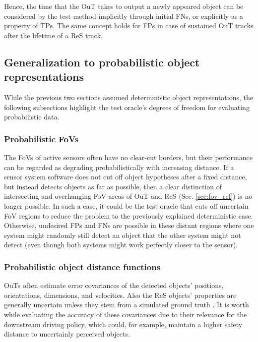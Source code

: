 \documentclass[conference]{IEEEtran}
\begin{document}
Hence, the time that the OuT takes to output a newly appeared object can be considered by the test method implicitly through initial FNs, or explicitly as a property of TPs.
The same concept holds for FPs in case of sustained OuT tracks after the lifetime of a ReS track.



\subsection{Generalization to probabilistic object representations}
\label{sec:oracle_probabilistic}

While the previous two sections assumed deterministic object representations, the following subsections highlight the test oracle's degrees of freedom for evaluating probabilistic data.

\subsubsection{Probabilistic FoVs}
\label{sec:prob_fov}

The FoVs of active sensors often have no clear-cut borders, but their performance can be regarded as degrading probabilistically with increasing distance. 
If a sensor system software does not cut off object hypotheses after a fixed distance, but instead detects objects as far as possible, then a clear distinction of intersecting and overhanging FoV areas of OuT and ReS (Sec. \ref{sec:fov_ref}) is no longer possible.
In such a case, it could be the test oracle that cuts off uncertain FoV regions to reduce the problem to the previously explained deterministic case.
Otherwise, undesired FPs and FNs are possible in these distant regions where one system might randomly still detect an object that the other system might not detect (even though both systems might work perfectly closer to the sensor).


\subsubsection{Probabilistic object distance functions}
\label{sec:prob_bbox}
OuTs often estimate error covariances of the detected objects' positions, orientations, dimensions, and velocities. 
Also the ReS objects' properties are generally uncertain unless they stem from a simulated ground truth \cite{Wang2020inferring_iros}.
It is worth while evaluating the accuracy of these covariances due to their relevance for the downstream driving policy, which could, for example, maintain a higher safety distance to uncertainly perceived objects.
\end{document}

